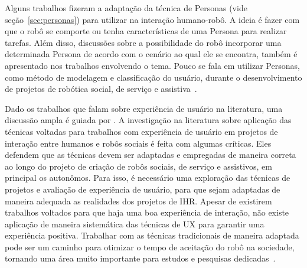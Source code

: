 Alguns trabalhos fizeram a adaptação da técnica de Personas (vide seção~\ref{sec:personas}) para utilizar na interação humano-robô. A ideia é fazer com que o robô se comporte ou tenha características de uma Persona para realizar tarefas. Além disso, discussões sobre a possibilidade do robô incorporar uma determinada Persona de acordo com o cenário ao qual ele se encontra, também é apresentado nos trabalhos envolvendo o tema. Pouco se fala em utilizar Personas, como método de modelagem e classificação do usuário, durante o desenvolvimento de projetos de robótica social, de serviço e assistiva~\cite{woods:2005, ljungblad:2006, meerbeek:2009, ruckert:2011, duque:2013, ruckert:2013}.

Dado os trabalhos que falam sobre experiência de usuário na literatura, uma discussão ampla é guiada por \textcite{alenljung:2017}. A investigação na literatura sobre aplicação das técnicas voltadas para trabalhos com experiência de usuário em projetos de interação entre humanos e robôs sociais é feita com algumas críticas. Eles defendem que as técnicas devem ser adaptadas e empregadas de maneira correta ao longo do projeto de criação de robôs sociais, de serviço e assistivos, em principal os autonômos. Para isso, é necessário uma exploração das técnicas de projetos e avaliação de experiência de usuário, para que sejam adaptadas de maneira adequada as realidades dos projetos de IHR. Apesar de existirem trabalhos voltados para que haja uma boa experiência de interação, não existe aplicação de maneira sistemática das técnicas de UX para garantir uma experiência positiva. Trabalhar com as técnicas tradicionais de maneira adaptada pode ser um caminho para otimizar o tempo de aceitação do robô na sociedade, tornando uma área muito importante para estudos e pesquisas dedicadas~\cite{alenljung:2017}.
